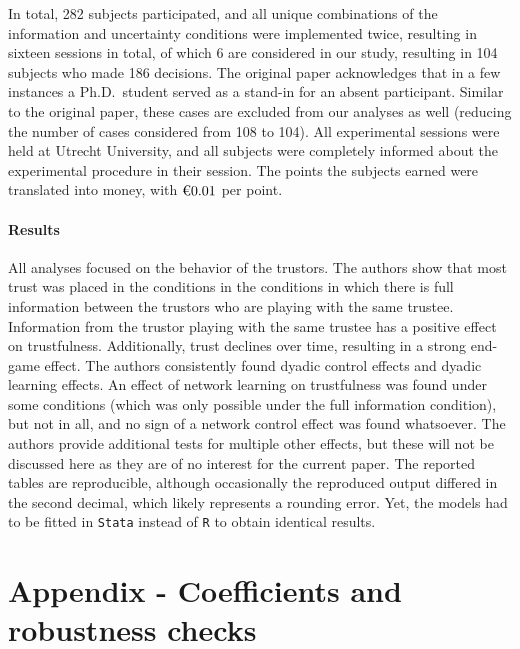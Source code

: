 \documentclass[
  11pt,
]{article}
\begin{document}
In total, 282 subjects participated, and all unique combinations of the information and uncertainty conditions were implemented twice, resulting in sixteen sessions in total, of which 6 are considered in our study, resulting in 104 subjects who made 186 decisions.
The original paper acknowledges that in a few instances a Ph.D.~student served as a stand-in for an absent participant. Similar to the original paper, these cases are excluded from our analyses as well (reducing the number of cases considered from 108 to 104).
All experimental sessions were held at Utrecht University, and all subjects were completely informed about the experimental procedure in their session. The points the subjects earned were translated into money, with \(\text{\texteuro}0.01\) per point.

\hypertarget{results-8}{%
\paragraph{Results}\label{results-8}}

All analyses focused on the behavior of the trustors. The authors show that most trust was placed in the conditions in the conditions in which there is full information between the trustors who are playing with the same trustee. Information from the trustor playing with the same trustee has a positive effect on trustfulness. Additionally, trust declines over time, resulting in a strong end-game effect. The authors consistently found dyadic control effects and dyadic learning effects. An effect of network learning on trustfulness was found under some conditions (which was only possible under the full information condition), but not in all, and no sign of a network control effect was found whatsoever. The authors provide additional tests for multiple other effects, but these will not be discussed here as they are of no interest for the current paper.
The reported tables are reproducible, although occasionally the reproduced output differed in the second decimal, which likely represents a rounding error.
Yet, the models had to be fitted in \texttt{Stata} instead of \texttt{R} to obtain identical results.

\newpage

\hypertarget{AppB}{%
\section{Appendix - Coefficients and robustness checks}\label{AppB}}
\end{document}
